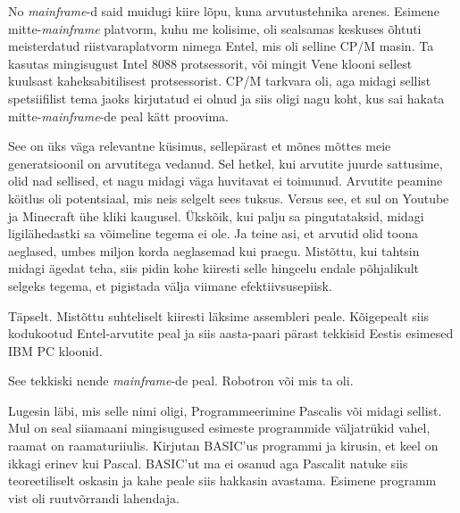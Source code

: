 No \emph{mainframe}-d said muidugi kiire lõpu, kuna arvutustehnika arenes. 
Esimene mitte-\emph{mainframe} platvorm, kuhu me kolisime, oli sealsamas 
keskuses õhtuti meisterdatud riistvaraplatvorm nimega 
Entel, mis oli selline CP/M masin. Ta kasutas mingisugust 
Intel 8088 protsessorit, või mingit Vene klooni sellest kuulsast 
kaheksabitilisest protsessorist. CP/M tarkvara oli, aga midagi sellist 
spetsiifilist tema jaoks kirjutatud ei olnud ja  siis oligi nagu koht, kus sai 
hakata mitte-\emph{mainframe}-de peal kätt proovima. 


See on üks väga relevantne küsimus, sellepärast et mõnes mõttes meie 
generatsioonil on arvutitega vedanud. Sel hetkel, kui arvutite juurde 
sattusime, olid nad sellised, et nagu midagi väga huvitavat ei toimunud. 
Arvutite peamine köitlus oli potentsiaal, mis neis selgelt sees tuksus. Versus 
see, et sul on Youtube ja Minecraft ühe kliki kaugusel. Ükskõik, kui palju sa  
pingutataksid, midagi  ligilähedastki sa võimeline tegema ei ole. Ja teine asi, 
et arvutid olid toona aeglased,  umbes  miljon korda aeglasemad kui praegu. 
Mistõttu, kui tahtsin midagi ägedat teha, siis pidin kohe kiiresti selle 
hingeelu endale põhjalikult selgeks tegema, et pigistada välja viimane 
efektiivsusepiisk.


Täpselt. Mistõttu suhteliselt kiiresti läksime 
assembleri peale. Kõigepealt siis kodukootud 
Entel-arvutite peal ja siis aasta-paari pärast tekkisid Eestis esimesed IBM PC 
kloonid. 


See tekkiski nende \emph{mainframe}-de peal. Robotron või mis ta oli.


Lugesin läbi, mis selle nimi oligi, Programmeerimine 
Pascalis 
või midagi sellist. Mul on seal siiamaani mingisugused esimeste programmide 
väljatrükid  vahel, raamat on raamaturiiulis. Kirjutan 
BASIC'us programmi ja kirusin, et keel on ikkagi erinev kui 
Pascal. BASIC'ut ma ei osanud aga Pascalit natuke siis teoreetiliselt oskasin ja 
kahe peale siis hakkasin avastama. Esimene programm vist oli ruutvõrrandi 
lahendaja.

